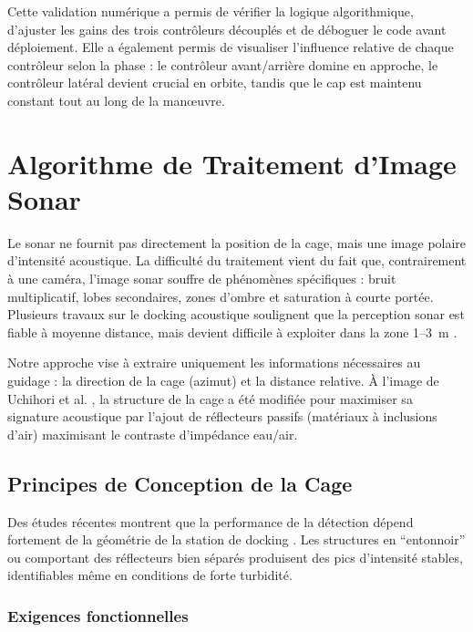 Cette validation numérique a permis de vérifier la logique algorithmique, d'ajuster les gains des trois contrôleurs découplés et de déboguer le code avant déploiement. Elle a également permis de visualiser l'influence relative de chaque contrôleur selon la phase : le contrôleur avant/arrière domine en approche, le contrôleur latéral devient crucial en orbite, tandis que le cap est maintenu constant tout au long de la manœuvre.


\section{Algorithme de Traitement d'Image Sonar}

Le sonar ne fournit pas directement la position de la cage, mais une image polaire d’intensité acoustique. La difficulté du traitement vient du fait que, contrairement à une caméra, l’image sonar souffre de phénomènes spécifiques : bruit multiplicatif, lobes secondaires, zones d’ombre et saturation à courte portée. Plusieurs travaux sur le docking acoustique soulignent que la perception sonar est fiable à moyenne distance, mais devient difficile à exploiter dans la zone \mbox{1–3 m} \cite{palomeras2016_iauv_panel, wang2023_acoustic_mfls_docking}. 

Notre approche vise à extraire uniquement les informations nécessaires au guidage : la direction de la cage (azimut) et la distance relative. À l’image de Uchihori et al. \cite{uchihori2019_3dsonar_docking}, la structure de la cage a été modifiée pour maximiser sa signature acoustique par l’ajout de réflecteurs passifs (matériaux à inclusions d'air) maximisant le contraste d'impédance eau/air.

\subsection{Principes de Conception de la Cage}

Des études récentes montrent que la performance de la détection dépend fortement de la géométrie de la station de docking \cite{yazdani2020_survey_docking}. Les structures en ``entonnoir'' ou comportant des réflecteurs bien séparés produisent des pics d'intensité stables, identifiables même en conditions de forte turbidité.

\subsubsection*{Exigences fonctionnelles}

